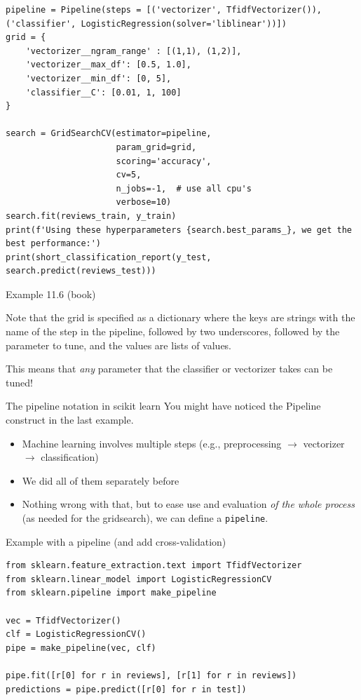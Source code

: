 \documentclass[compress]{beamer}
\begin{document}
\begin{frame}
	\small
\begin{lstlisting}
pipeline = Pipeline(steps = [('vectorizer', TfidfVectorizer()), ('classifier', LogisticRegression(solver='liblinear'))])
grid = {
    'vectorizer__ngram_range' : [(1,1), (1,2)],
    'vectorizer__max_df': [0.5, 1.0],
    'vectorizer__min_df': [0, 5],
    'classifier__C': [0.01, 1, 100]
}

search = GridSearchCV(estimator=pipeline,
                      param_grid=grid,
                      scoring='accuracy', 
                      cv=5,
                      n_jobs=-1,  # use all cpu's
                      verbose=10)
search.fit(reviews_train, y_train)
print(f'Using these hyperparameters {search.best_params_}, we get the best performance:')
print(short_classification_report(y_test, search.predict(reviews_test)))
\end{lstlisting}
Example 11.6 (book)
\end{frame}

\begin{frame}[standout]
Note that the grid is specified as a dictionary where the keys are strings with the name of the step in the pipeline, followed by two underscores, followed by the parameter to tune, and the values are lists of values.

This means that \emph{any} parameter that the classifier or vectorizer takes can be tuned!
\end{frame}



\begin{frame}{The pipeline notation in scikit learn}
You might have noticed the Pipeline construct in the last example.
	\begin{itemize}
		\item Machine learning involves multiple steps (e.g., preprocessing $\rightarrow$ vectorizer $\rightarrow$ classification)
		\item We did all of them separately before
		\item Nothing wrong with that, but to ease use and evaluation \emph{of the whole process} (as needed for the gridsearch), we can define a \texttt{pipeline}.
	\end{itemize}
	
\end{frame}

\begin{frame}[fragile]{Example with a pipeline (and add cross-validation)}
\begin{lstlisting}
from sklearn.feature_extraction.text import TfidfVectorizer
from sklearn.linear_model import LogisticRegressionCV
from sklearn.pipeline import make_pipeline

vec = TfidfVectorizer()
clf = LogisticRegressionCV()
pipe = make_pipeline(vec, clf)

pipe.fit([r[0] for r in reviews], [r[1] for r in reviews])
predictions = pipe.predict([r[0] for r in test])
\end{lstlisting}
\end{frame}
\end{document}
